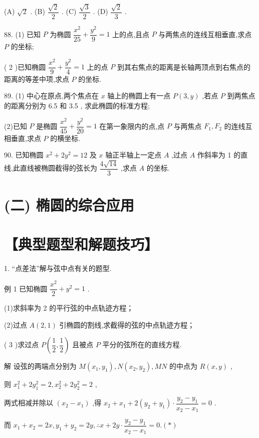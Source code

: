 (A) $\sqrt{2}$ . (B) $\dfrac{\sqrt{2}}{2}$ . (C) $\dfrac{\sqrt{3}}{2}$ . (D) $\dfrac{\sqrt{2}}{3}$ .

88. (1) 已知 $P$ 为椭圆 $\dfrac{{x}^{2}}{25} + \dfrac{{y}^{2}}{9} = 1$ 上的点,且点 $P$ 与两焦点的连线互相垂直,求点 $P$ 的坐标;

( 2 )已知椭圆 $\dfrac{{x}^{2}}{9} + \dfrac{{y}^{2}}{4} = 1$ 上的点 $P$ 到其右焦点的距离是长轴两顶点到右焦点的距离的等差中项,求点 $P$ 的坐标.

89. (1) 中心在原点,两个焦点在 $x$ 轴上的椭圆上有一点 $P\left( {3,y}\right)$ ,若点 $P$ 到两焦点的距离分别为 6.5 和 3.5 , 求此椭圆的标准方程;

(2)已知 $P$ 是椭圆 $\dfrac{{x}^{2}}{45} + \dfrac{{y}^{2}}{20} = 1$ 在第一象限内的点,点 $P$ 与两焦点 ${F}_{1},{F}_{2}$ 的连线互相垂直,求点 $P$ 的横坐标.

90. 已知椭圆 ${x}^{2} + 2{y}^{2} = {12}$ 及 $x$ 轴正半轴上一定点 $A$ ,过点 $A$ 作斜率为 1 的直线,此直线被椭圆截得的弦长为 $\dfrac{4\sqrt{14}}{3}$ ,求点 $A$ 的坐标.

\section*{(二) 椭圆的综合应用}

\section*{【典型题型和解题技巧】}

1. “点差法”解与弦中点有关的题型.

例 1 已知椭圆 $\dfrac{{x}^{2}}{2} + {y}^{2} = 1$ .

(1)求斜率为 2 的平行弦的中点轨迹方程；

(2)过点 $A\left( {2,1}\right)$ 引椭圆的割线,求截得的弦的中点轨迹方程；

( 3 )求过点 $P\left( {\dfrac{1}{2},\dfrac{1}{2}}\right)$ 且被点 $P$ 平分的弦所在的直线方程.

解 设弦的两端点分别为 $M\left( {{x}_{1},{y}_{1}}\right) ,N\left( {{x}_{2},{y}_{2}}\right) ,{MN}$ 的中点为 $R\left( {x,y}\right)$ ,

则 ${x}_{1}^{2} + 2{y}_{1}^{2} = 2,{x}_{2}^{2} + 2{y}_{2}^{2} = 2$ ,

两式相减并除以 $\left( {{x}_{2} - {x}_{1}}\right)$ ,得 ${x}_{2} + {x}_{1} + 2\left( {{y}_{2} + {y}_{1}}\right)  \cdot  \dfrac{{y}_{2} - {y}_{1}}{{x}_{2} - {x}_{1}} = 0$ .

而 ${x}_{1} + {x}_{2} = {2x},{y}_{1} + {y}_{2} = {2y},\therefore x + {2y} \cdot  \dfrac{{y}_{2} - {y}_{1}}{{x}_{2} - {x}_{1}} = 0.\left( *\right)$

